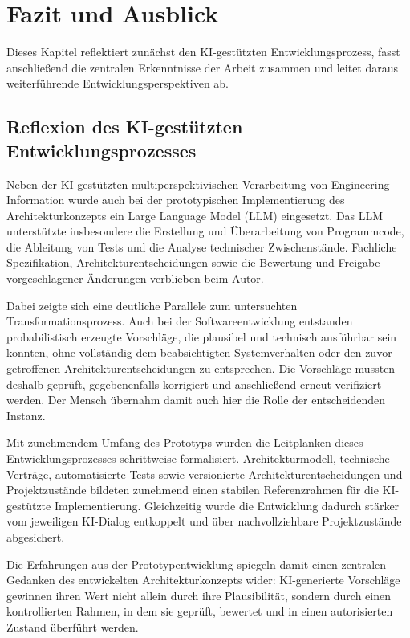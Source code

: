 \section{Fazit und Ausblick}
\label{sec:conclusion}

Dieses Kapitel reflektiert zunächst den KI-gestützten Entwicklungsprozess,
fasst anschließend die zentralen Erkenntnisse der Arbeit zusammen und leitet
daraus weiterführende Entwicklungsperspektiven ab.

\subsection{Reflexion des KI-gestützten Entwicklungsprozesses}

Neben der KI-gestützten multiperspektivischen Verarbeitung von
Engineering-Information wurde auch bei der prototypischen Implementierung des
Architekturkonzepts ein Large Language Model (LLM) eingesetzt. Das LLM
unterstützte insbesondere die Erstellung und Überarbeitung von Programmcode,
die Ableitung von Tests und die Analyse technischer Zwischenstände. Fachliche
Spezifikation, Architekturentscheidungen sowie die Bewertung und Freigabe
vorgeschlagener Änderungen verblieben beim Autor.

Dabei zeigte sich eine deutliche Parallele zum untersuchten
Transformationsprozess. Auch bei der Softwareentwicklung entstanden
probabilistisch erzeugte Vorschläge, die plausibel und technisch ausführbar
sein konnten, ohne vollständig dem beabsichtigten Systemverhalten oder den
zuvor getroffenen Architekturentscheidungen zu entsprechen. Die Vorschläge
mussten deshalb geprüft, gegebenenfalls korrigiert und anschließend erneut
verifiziert werden. Der Mensch übernahm damit auch hier die Rolle der
entscheidenden Instanz.

Mit zunehmendem Umfang des Prototyps wurden die Leitplanken dieses
Entwicklungsprozesses schrittweise formalisiert. Architekturmodell, technische
Verträge, automatisierte Tests sowie versionierte Architekturentscheidungen
und Projektzustände bildeten zunehmend einen stabilen Referenzrahmen für die
KI-gestützte Implementierung. Gleichzeitig wurde die Entwicklung dadurch
stärker vom jeweiligen KI-Dialog entkoppelt und über nachvollziehbare
Projektzustände abgesichert.

Die Erfahrungen aus der Prototypentwicklung spiegeln damit einen zentralen
Gedanken des entwickelten Architekturkonzepts wider: KI-generierte Vorschläge
gewinnen ihren Wert nicht allein durch ihre Plausibilität, sondern durch einen
kontrollierten Rahmen, in dem sie geprüft, bewertet und in einen autorisierten
Zustand überführt werden.
\clearpage
